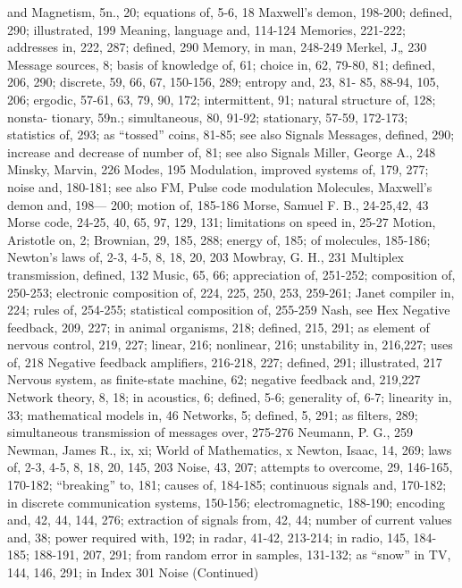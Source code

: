 {{{{{{{{{{{{{{{and Magnetism, 5n., 20;
equations of, 5-6, 18
Maxwell’s demon, 198-200; defined,
290; illustrated, 199
Meaning, language and, 114-124
Memories, 221-222; addresses in, 222,
287; defined, 290
Memory, in man, 248-249
Merkel, J„ 230
Message sources, 8; basis of knowledge
of, 61; choice in, 62, 79-80, 81; defined,
206, 290; discrete, 59, 66, 67,
150-156, 289; entropy and, 23, 81-
85, 88-94, 105, 206; ergodic, 57-61,
63, 79, 90, 172; intermittent, 91;
natural structure of, 128; nonsta-
tionary, 59n.; simultaneous, 80,
91-92; stationary, 57-59, 172-173;
statistics of, 293; as “tossed” coins,
81-85; see also Signals
Messages, defined, 290; increase and
decrease of number of, 81; see also
Signals
Miller, George A., 248
Minsky, Marvin, 226
Modes, 195
Modulation, improved systems of, 179,
277; noise and, 180-181; see also
FM, Pulse code modulation
Molecules, Maxwell’s demon and, 198—
200; motion of, 185-186
Morse, Samuel F. B., 24-25,42, 43
Morse code, 24-25, 40, 65, 97, 129, 131;
limitations on speed in, 25-27
Motion, Aristotle on, 2; Brownian, 29,
185, 288; energy of, 185; of molecules,
185-186; Newton’s laws of,
2-3, 4-5, 8, 18, 20, 203
Mowbray, G. H., 231
Multiplex transmission, defined, 132
Music, 65, 66; appreciation of, 251-252;
composition of, 250-253; electronic
composition of, 224, 225, 250, 253,
259-261; Janet compiler in, 224;
rules of, 254-255; statistical composition
of, 255-259
Nash, see Hex
Negative feedback, 209, 227; in animal
organisms, 218; defined, 215, 291;
as element of nervous control, 219,
227; linear, 216; nonlinear, 216;
unstability in, 216,227; uses of, 218
Negative feedback amplifiers, 216-218,
227; defined, 291; illustrated, 217
Nervous system, as finite-state machine,
62; negative feedback and, 219,227
Network theory, 8, 18; in acoustics, 6;
defined, 5-6; generality of, 6-7;
linearity in, 33; mathematical
models in, 46
Networks, 5; defined, 5, 291; as filters,
289; simultaneous transmission of
messages over, 275-276
Neumann, P. G., 259
Newman, James R., ix, xi; World of
Mathematics, x
Newton, Isaac, 14, 269; laws of, 2-3,
4-5, 8, 18, 20, 145, 203
Noise, 43, 207; attempts to overcome,
29, 146-165, 170-182; “breaking”
to, 181; causes of, 184-185; continuous
signals and, 170-182; in
discrete communication systems,
150-156; electromagnetic, 188-190;
encoding and, 42, 44, 144, 276; extraction
of signals from, 42, 44;
number of current values and, 38;
power required with, 192; in radar,
41-42, 213-214; in radio, 145, 184-
185; 188-191, 207, 291; from random
error in samples, 131-132; as
“snow” in TV, 144, 146, 291; in
Index 301
Noise (Continued)
}}}}}}}}}}}}}}}
